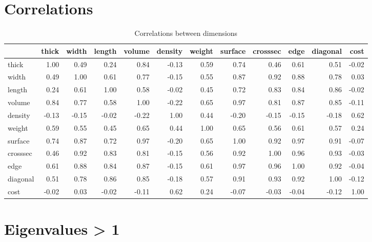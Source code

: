 \documentclass[
]{book}
\begin{document}
\hypertarget{correlations}{%
\section{Correlations}\label{correlations}}

\tiny
\begin{table}

\caption{\label{tab:unnamed-chunk-12}Correlations between dimensions}
\centering
\begin{tabular}[t]{l|r|r|r|r|r|r|r|r|r|r|r}
\hline
  & thick & width & length & volume & density & weight & surface & crosssec & edge & diagonal & cost\\
\hline
thick & 1.00 & 0.49 & 0.24 & 0.84 & -0.13 & 0.59 & 0.74 & 0.46 & 0.61 & 0.51 & -0.02\\
\hline
width & 0.49 & 1.00 & 0.61 & 0.77 & -0.15 & 0.55 & 0.87 & 0.92 & 0.88 & 0.78 & 0.03\\
\hline
length & 0.24 & 0.61 & 1.00 & 0.58 & -0.02 & 0.45 & 0.72 & 0.83 & 0.84 & 0.86 & -0.02\\
\hline
volume & 0.84 & 0.77 & 0.58 & 1.00 & -0.22 & 0.65 & 0.97 & 0.81 & 0.87 & 0.85 & -0.11\\
\hline
density & -0.13 & -0.15 & -0.02 & -0.22 & 1.00 & 0.44 & -0.20 & -0.15 & -0.15 & -0.18 & 0.62\\
\hline
weight & 0.59 & 0.55 & 0.45 & 0.65 & 0.44 & 1.00 & 0.65 & 0.56 & 0.61 & 0.57 & 0.24\\
\hline
surface & 0.74 & 0.87 & 0.72 & 0.97 & -0.20 & 0.65 & 1.00 & 0.92 & 0.97 & 0.91 & -0.07\\
\hline
crosssec & 0.46 & 0.92 & 0.83 & 0.81 & -0.15 & 0.56 & 0.92 & 1.00 & 0.96 & 0.93 & -0.03\\
\hline
edge & 0.61 & 0.88 & 0.84 & 0.87 & -0.15 & 0.61 & 0.97 & 0.96 & 1.00 & 0.92 & -0.04\\
\hline
diagonal & 0.51 & 0.78 & 0.86 & 0.85 & -0.18 & 0.57 & 0.91 & 0.93 & 0.92 & 1.00 & -0.12\\
\hline
cost & -0.02 & 0.03 & -0.02 & -0.11 & 0.62 & 0.24 & -0.07 & -0.03 & -0.04 & -0.12 & 1.00\\
\hline
\end{tabular}
\end{table}

\hypertarget{eigenvalues-1}{%
\section{Eigenvalues \textgreater{} 1}\label{eigenvalues-1}}
\end{document}
